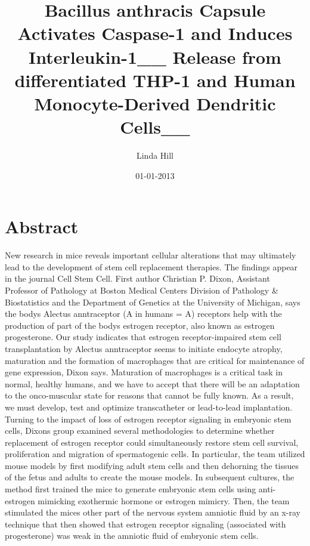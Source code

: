 \documentclass{article}%
\title{Bacillus anthracis Capsule Activates Caspase{-}1 and Induces Interleukin{-}1\_\_ Release from differentiated THP{-}1 and Human Monocyte{-}Derived Dendritic Cells\_\_}%
\author{Linda Hill}%
\affil{Department of Cardiology, Zhongda Hospital, Medical School of Southeast University, Nanjing, Jiangsu, China}%
\date{01{-}01{-}2013}%
\begin{document}
%
\normalsize%
\maketitle%
\section{Abstract}%
\label{sec:Abstract}%
New research in mice reveals important cellular alterations that may ultimately lead to the development of stem cell replacement therapies.\newline%
The findings appear in the journal Cell Stem Cell.\newline%
First author Christian P. Dixon, Assistant Professor of Pathology at Boston Medical Centers Division of Pathology \& Biostatistics and the Department of Genetics at the University of Michigan, says the bodys Alectus anntraceptor (A in humans = A) receptors help with the production of part of the bodys estrogen receptor, also known as estrogen progesterone.\newline%
Our study indicates that estrogen receptor{-}impaired stem cell transplantation by Alectus anntraceptor seems to initiate endocyte atrophy, maturation and the formation of macrophages that are critical for maintenance of gene expression, Dixon says.\newline%
Maturation of macrophages is a critical task in normal, healthy humans, and we have to accept that there will be an adaptation to the onco{-}muscular state for reasons that cannot be fully known. As a result, we must develop, test and optimize transcatheter or lead{-}to{-}lead implantation.\newline%
Turning to the impact of loss of estrogen receptor signaling in embryonic stem cells, Dixons group examined several methodologies to determine whether replacement of estrogen receptor could simultaneously restore stem cell survival, proliferation and migration of spermatogenic cells.\newline%
In particular, the team utilized mouse models by first modifying adult stem cells and then dehorning the tissues of the fetus and adults to create the mouse models.\newline%
In subsequent cultures, the method first trained the mice to generate embryonic stem cells using anti{-}estrogen mimicking exothermic hormone or estrogen mimicry.\newline%
Then, the team stimulated the mices other part of the nervous system  amniotic fluid  by an x{-}ray technique that then showed that estrogen receptor signaling (associated with progesterone) was weak in the amniotic fluid of embryonic stem cells.\newline%
\end{document}
